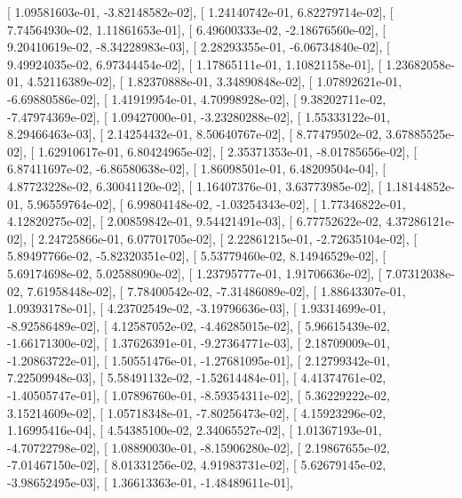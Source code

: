 \documentclass{article}
\begin{document}
       [  1.09581603e-01,  -3.82148582e-02],
       [  1.24140742e-01,   6.82279714e-02],
       [  7.74564930e-02,   1.11861653e-01],
       [  6.49600333e-02,  -2.18676560e-02],
       [  9.20410619e-02,  -8.34228983e-03],
       [  2.28293355e-01,  -6.06734840e-02],
       [  9.49924035e-02,   6.97344454e-02],
       [  1.17865111e-01,   1.10821158e-01],
       [  1.23682058e-01,   4.52116389e-02],
       [  1.82370888e-01,   3.34890848e-02],
       [  1.07892621e-01,  -6.69880586e-02],
       [  1.41919954e-01,   4.70998928e-02],
       [  9.38202711e-02,  -7.47974369e-02],
       [  1.09427000e-01,  -3.23280288e-02],
       [  1.55333122e-01,   8.29466463e-03],
       [  2.14254432e-01,   8.50640767e-02],
       [  8.77479502e-02,   3.67885525e-02],
       [  1.62910617e-01,   6.80424965e-02],
       [  2.35371353e-01,  -8.01785656e-02],
       [  6.87411697e-02,  -6.86580638e-02],
       [  1.86098501e-01,   6.48209504e-04],
       [  4.87723228e-02,   6.30041120e-02],
       [  1.16407376e-01,   3.63773985e-02],
       [  1.18144852e-01,   5.96559764e-02],
       [  6.99804148e-02,  -1.03254343e-02],
       [  1.77346822e-01,   4.12820275e-02],
       [  2.00859842e-01,   9.54421491e-03],
       [  6.77752622e-02,   4.37286121e-02],
       [  2.24725866e-01,   6.07701705e-02],
       [  2.22861215e-01,  -2.72635104e-02],
       [  5.89497766e-02,  -5.82320351e-02],
       [  5.53779460e-02,   8.14946529e-02],
       [  5.69174698e-02,   5.02588090e-02],
       [  1.23795777e-01,   1.91706636e-02],
       [  7.07312038e-02,   7.61958448e-02],
       [  7.78400542e-02,  -7.31486089e-02],
       [  1.88643307e-01,   1.09393178e-01],
       [  4.23702549e-02,  -3.19796636e-03],
       [  1.93314699e-01,  -8.92586489e-02],
       [  4.12587052e-02,  -4.46285015e-02],
       [  5.96615439e-02,  -1.66171300e-02],
       [  1.37626391e-01,  -9.27364771e-03],
       [  2.18709009e-01,  -1.20863722e-01],
       [  1.50551476e-01,  -1.27681095e-01],
       [  2.12799342e-01,   7.22509948e-03],
       [  5.58491132e-02,  -1.52614484e-01],
       [  4.41374761e-02,  -1.40505747e-01],
       [  1.07896760e-01,  -8.59354311e-02],
       [  5.36229222e-02,   3.15214609e-02],
       [  1.05718348e-01,  -7.80256473e-02],
       [  4.15923296e-02,   1.16995416e-04],
       [  4.54385100e-02,   2.34065527e-02],
       [  1.01367193e-01,  -4.70722798e-02],
       [  1.08890030e-01,  -8.15906280e-02],
       [  2.19867655e-02,  -7.01467150e-02],
       [  8.01331256e-02,   4.91983731e-02],
       [  5.62679145e-02,  -3.98652495e-03],
       [  1.36613363e-01,  -1.48489611e-01],
\end{document}
